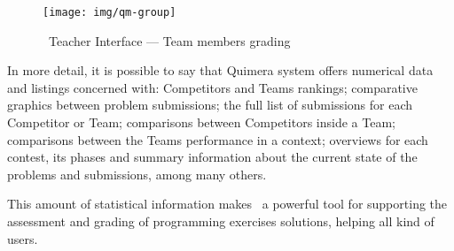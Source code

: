 \begin{figure}[h]
\begin{center}
\texttt{[image: img/qm-group]}
\caption{\quim\ \textsf{Teacher} Interface --- \textsf{Team} members grading}\label{fig:group}
\end{center}
\end{figure}

In more detail, it is possible to say that Quimera system offers numerical data and listings concerned with:
 \textsf{Competitors} and \textsf{Teams} rankings;
comparative graphics between problem submissions;
the full list of submissions for each \textsf{Competitor} or \textsf{Team};
comparisons between \textsf{Competitors} inside a \textsf{Team};
comparisons between the \textsf{Teams} performance in a context;
overviews for each contest, its phases and summary information about the current state of the problems and submissions,
among many others.

\newpage
This amount of statistical information makes \quim\ a powerful tool for supporting the assessment and grading of programming exercises solutions, 
helping all kind of users.%

